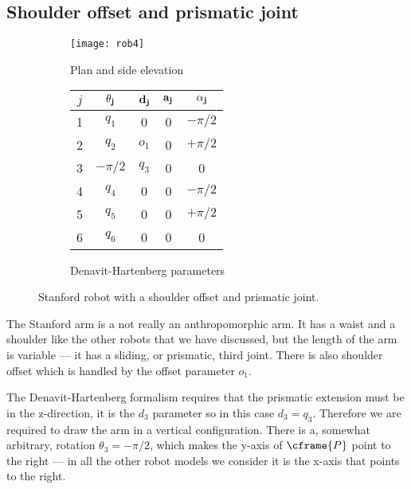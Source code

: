 \documentclass[11pt]{article}
\numberwithin{equation}{section}
\begin{document}
\pagebreak

\subsection{Shoulder offset and prismatic joint}

	\begin{figure}[h]
	\centering
	\begin{subfigure}[b]{0.6\textwidth}
	\centering
		\texttt{[image: rob4]}
		\caption{Plan and side elevation}
	\label{fig:rob4} 
	\end{subfigure}
	\begin{subfigure}[b]{0.3\textwidth}
		\begin{tabular}{|c|c|c|c|c|} \hline
			$j$ & $\bf \theta_j$ & $\bf d_j$ & $\bf a_j$ & $\bf \alpha_j$ \\ \hline
			\rowcolor{SkyBlue}1 &  $q_1$ & \cellcolor{White} 0 &  0 & $-\pi/2$ \\
			\rowcolor{SkyBlue}2 &  $q_2$ & $o_1$ & 0& $+\pi/2$ \\
			\rowcolor{SkyBlue}3 & $-\pi/2$ & $q_3$ & 0  & 0 \\
			\rowcolor{Peach}4 &  $q_4$ & 0  & 0 & $-\pi/2$  \\
			\rowcolor{Peach}5 &$q_5$ & 0 & 0 & $+\pi/2$ \\
			\cellcolor{Peach} 6 & \cellcolor{Peach} $q_6$ & 0 & 0 & 0 \\ \hline
		\end{tabular}
		\caption{Denavit-Hartenberg parameters}
		\label{fig:dh4}
	\end{subfigure}
	\caption{Stanford  robot with a shoulder offset and prismatic joint.}
	\end{figure}

The Stanford arm is a not really an anthropomorphic arm.  It has a waist and a shoulder like the other robots that we have discussed, but the
length of the arm is variable --- it has a  sliding, or prismatic, third joint.  There is also shoulder offset which is
handled by the offset parameter $o_1$.

The Denavit-Hartenberg formalism requires that the prismatic extension must be in the z-direction, it is the $d_3$ parameter so in this case
$d_3 = q_3$.
Therefore we are required to draw the arm in a vertical configuration.
There is a, somewhat arbitrary, rotation $\theta_3 = -\pi/2$, which makes the y-axis of $\cframe{P}$ point to the right --- in all the other robot models
we consider it is the x-axis that points to the right.
\end{document}

